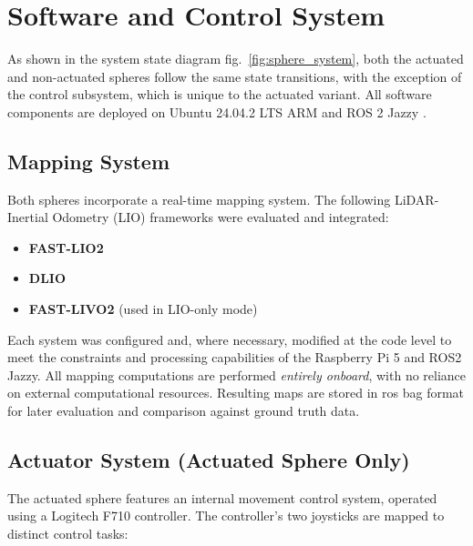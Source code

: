\documentclass[conference]{IEEEtran}
\begin{document}
\section{Software and Control System}


As shown in the system state diagram fig.~\ref{fig:sphere_system}, both the actuated and non-actuated spheres follow the same state transitions, with the exception of the control subsystem, which is unique to the actuated variant. All software components are deployed on Ubuntu 24.04.2 LTS ARM and ROS 2 Jazzy .

\subsection{Mapping System}

Both spheres incorporate a real-time mapping system. The following LiDAR-Inertial Odometry (LIO) frameworks were evaluated and integrated:

\begin{itemize}
    \item \textbf{FAST-LIO2}
    \item \textbf{DLIO}
    \item \textbf{FAST-LIVO2} (used in LIO-only mode)
\end{itemize}

Each system was configured and, where necessary, modified at the code level to meet the constraints and processing capabilities of the Raspberry Pi 5 and ROS2 Jazzy. All mapping computations are performed \textit{entirely onboard}, with no reliance on external computational resources. Resulting maps are stored in ros bag format for later evaluation and comparison against ground truth data.

\subsection{Actuator System (Actuated Sphere Only)}

The actuated sphere features an internal movement control system, operated using a  Logitech F710 controller. The controller's two joysticks are mapped to distinct control tasks:
\end{document}
